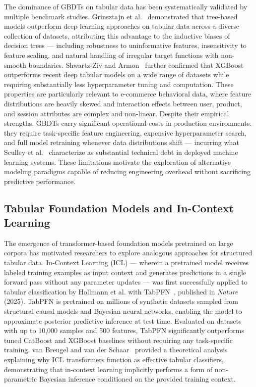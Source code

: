 \documentclass[conference]{IEEEtran}
\begin{document}
The dominance of GBDTs on tabular data has been systematically validated
by multiple benchmark studies. Grinsztajn et
al.~\cite{grinsztajn2022tree} demonstrated that tree-based models
outperform deep learning approaches on tabular data across a diverse
collection of datasets, attributing this advantage to the inductive
biases of decision trees --- including robustness to uninformative
features, insensitivity to feature scaling, and natural handling of
irregular target functions with non-smooth boundaries. Shwartz-Ziv and
Armon~\cite{shwartzziv2022tabular} further confirmed that XGBoost
outperforms recent deep tabular models on a wide range of datasets while
requiring substantially less hyperparameter tuning and computation. These
properties are particularly relevant to e-commerce behavioral data, where
feature distributions are heavily skewed and interaction effects between
user, product, and session attributes are complex and non-linear. Despite
their empirical strengths, GBDTs carry significant operational costs in
production environments: they require task-specific feature engineering,
expensive hyperparameter search, and full model retraining whenever data
distributions shift --- incurring what Sculley et
al.~\cite{sculley2015hidden} characterize as substantial technical debt
in deployed machine learning systems. These limitations motivate the
exploration of alternative modeling paradigms capable of reducing
engineering overhead without sacrificing predictive performance.

\subsection{Tabular Foundation Models and In-Context Learning}

The emergence of transformer-based foundation models pretrained on large
corpora has motivated researchers to explore analogous approaches for
structured tabular data. In-Context Learning (ICL) --- wherein a
pretrained model receives labeled training examples as input context and
generates predictions in a single forward pass without any parameter
updates --- was first successfully applied to tabular classification by
Hollmann et al. with TabPFN~\cite{hollmann2024tabpfnv2}, published in
\textit{Nature} (2025). TabPFN is pretrained on millions of synthetic
datasets sampled from structural causal models and Bayesian neural
networks, enabling the model to approximate posterior predictive
inference at test time. Evaluated on datasets with up to 10,000 samples
and 500 features, TabPFN significantly outperforms tuned CatBoost and
XGBoost baselines without requiring any task-specific training. van
Breugel and van der Schaar~\cite{vanbreugel2024why} provided a
theoretical analysis explaining why ICL transformers function as
effective tabular classifiers, demonstrating that in-context learning
implicitly performs a form of non-parametric Bayesian inference
conditioned on the provided training context.
\end{document}
